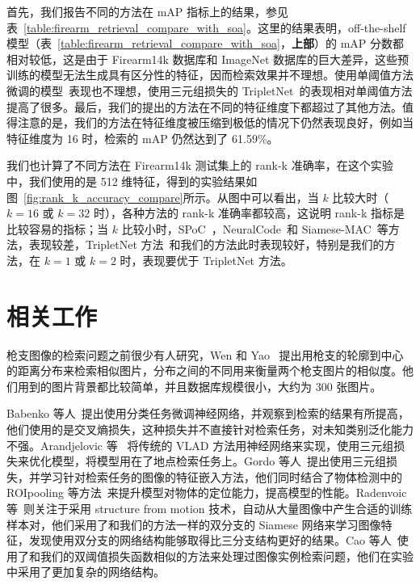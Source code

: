 首先，我们报告不同的方法在 mAP 指标上的结果，参见表~\ref{table:firearm_retrieval_compare_with_soa}。这里的结果表明，off-the-shelf 模型（表~\ref{table:firearm_retrieval_compare_with_soa}，\textbf{上部}）的 mAP 分数都相对较低，这是由于 Firearm14k 数据库和 ImageNet 数据库的巨大差异，这些预训练的模型无法生成具有区分性的特征，因而检索效果并不理想。使用单阈值方法微调的模型~\cite{Radenovic2016CNNIR}表现也不理想，使用三元组损失的 TripletNet~\cite{Gordo2016DeepIR}的表现相对单阈值方法提高了很多。最后，我们的提出的方法在不同的特征维度下都超过了其他方法。值得注意的是，我们的方法在特征维度被压缩到极低的情况下仍然表现良好，例如当特征维度为 16 时，检索的 mAP 仍然达到了 61.59\%。

我们也计算了不同方法在 Firearm14k 测试集上的 rank-k 准确率，在这个实验中，我们使用的是 512 维特征，得到的实验结果如图~\ref{fig:rank_k_accuracy_compare}所示。从图中可以看出，当 $k$ 比较大时（$k=16$ 或 $k=32$ 时），各种方法的 rank-k 准确率都较高，这说明 rank-k 指标是比较容易的指标；当 $k$ 比较小时，SPoC~\cite{Babenko2015AggregatingLD}，NeuralCode~\cite{Babenko2014NeuralCF}和 Siamese-MAC~\cite{Radenovic2016CNNIR}等方法，表现较差，TripletNet 方法~\cite{Gordo2016DeepIR}和我们的方法此时表现较好，特别是我们的方法，在 $k=1$ 或 $k=2$ 时，表现要优于 TripletNet 方法。

\section{相关工作}\label{sec:double_margin_related_work}
枪支图像的检索问题之前很少有人研究，Wen 和 Yao ~\cite{Wen2005PistolIR}提出用枪支的轮廓到中心的距离分布来检索相似图片，分布之间的不同用来衡量两个枪支图片的相似度。他们用到的图片背景都比较简单，并且数据库规模很小，大约为 300 张图片。

Babenko 等人~\cite{Babenko2014NeuralCF}提出使用分类任务微调神经网络，并观察到检索的结果有所提高，他们使用的是交叉熵损失，这种损失并不直接针对检索任务，对未知类别泛化能力不强。Arandjelovic 等~\cite{Arandjelovic2016NetVLADCA} 将传统的 VLAD 方法用神经网络来实现，使用三元组损失来优化模型，将模型用在了地点检索任务上。Gordo 等人~\cite{Gordo2016DeepIR}提出使用三元组损失，并学习针对检索任务的图像的特征嵌入方法，他们同时结合了物体检测中的 ROIpooling 等方法~\cite{Ren2017FasterRT}来提升模型对物体的定位能力，提高模型的性能。Radenvoic 等~\cite{Radenovic2016CNNIR}则关注于采用 structure from motion 技术，自动从大量图像中产生合适的训练样本对，他们采用了和我们的方法一样的双分支的 Siamese 网络来学习图像特征，发现使用双分支的网络结构能够取得比三分支结构更好的结果。Cao 等人~\cite{Cao2016QuartetnetLF}使用了和我们的双阈值损失函数相似的方法来处理过图像实例检索问题，他们在实验中采用了更加复杂的网络结构。

